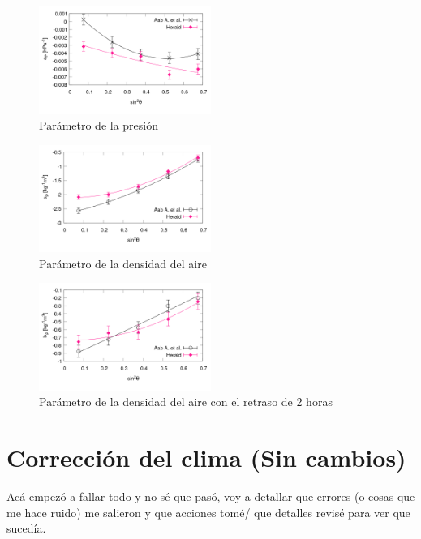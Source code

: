 \begin{figure}[H]
	\centering
	\includegraphics[width=0.5\textwidth]{figura_a_p.png}
	\caption{Parámetro de la presión}
	\label{fig:ap}
\end{figure}


\begin{figure}[H]
	\centering
	\includegraphics[width=0.5\textwidth]{figura_a_rho.png}
	\caption{Parámetro de la densidad del aire}
	\label{fig:arho}
\end{figure}

\begin{figure}[H]
	\centering
	\includegraphics[width=0.5\textwidth]{figura_b_rho.png}
	\caption{Parámetro de la densidad del aire con el retraso de 2 horas}
	\label{fig:brho}
\end{figure}


\section{Corrección del clima (Sin cambios)}

Acá empezó a fallar todo y no sé que pasó, voy a detallar que errores (o cosas que me hace ruido) me salieron y que acciones tomé/ que detalles revisé para ver que sucedía.

